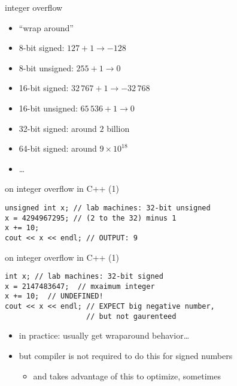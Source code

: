 \begin{frame}{integer overflow}
    \begin{itemize}
    \item ``wrap around''
    \item 8-bit signed: $127 + 1 \rightarrow -128$
    \item 8-bit unsigned: $255 + 1 \rightarrow 0$ 
    \item 16-bit signed: $32\,767 + 1 \rightarrow -32\,768$
    \item 16-bit unsigned: $65\,536 + 1 \rightarrow 0$ 
    \item 32-bit signed: around $2$ billion
    \item 64-bit signed: around $9\times 10^{18}$
    \item \ldots
    \end{itemize}
\end{frame}


\begin{frame}[fragile,label=cppIO1]{on integer overflow in C++ (1)}
\lstset{language=C++,style=small}
\begin{lstlisting}
unsigned int x; // lab machines: 32-bit unsigned
x = 4294967295; // (2 to the 32) minus 1
x += 10;
cout << x << endl; // OUTPUT: 9
\end{lstlisting}
\end{frame}

\begin{frame}[fragile,label=cppIO2]{on integer overflow in C++ (1)}
\lstset{language=C++,style=small}
\begin{lstlisting}
int x; // lab machines: 32-bit signed
x = 2147483647;  // mxaimum integer
x += 10;  // UNDEFINED!
cout << x << endl; // EXPECT big negative number,
                   // but not gaurenteed
\end{lstlisting}
    \begin{itemize}
    \item in practice: usually get wraparound behavior\ldots
    \item but compiler is not required to do this for signed numbers
        \begin{itemize}
        \item and takes advantage of this to optimize, sometimes
        \end{itemize}
    \end{itemize}
\end{frame}
